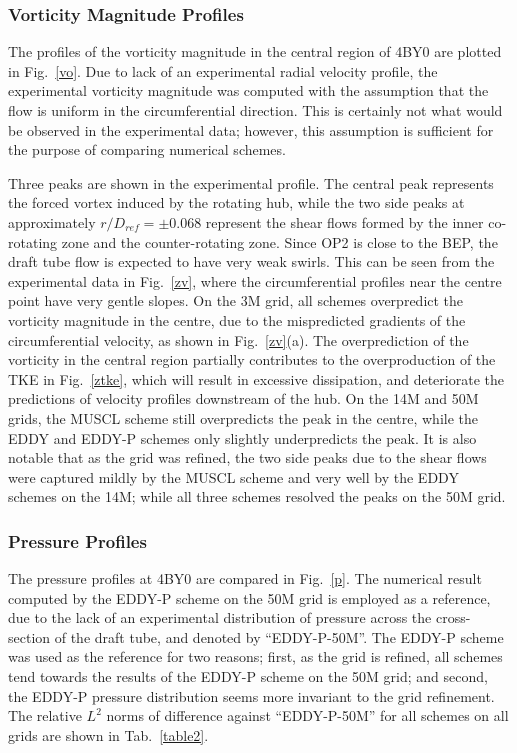 \subsubsection{Vorticity Magnitude Profiles}
The profiles of the vorticity magnitude in the central region of 4BY0 are plotted in Fig.~\ref{vo}. Due to lack of an experimental radial velocity profile, the experimental vorticity magnitude was computed with the assumption that the flow is uniform in the circumferential direction. This is certainly not what would be observed in the experimental data; however, this assumption is sufficient for the purpose of comparing numerical schemes. 

Three peaks are shown in the experimental profile. The central peak represents the forced vortex induced by the rotating hub, while the two side peaks at approximately $r/D_{ref}=\pm 0.068$ represent the shear flows formed by the inner co-rotating zone and the counter-rotating zone. Since OP2 is close to the BEP, the draft tube flow is expected to have very weak swirls. This can be seen from the experimental data in Fig.~\ref{zv}, where the circumferential profiles near the centre point have very gentle slopes. On the 3M grid, all schemes overpredict the vorticity magnitude in the centre, due to the mispredicted gradients of the circumferential velocity, as shown in Fig.~\ref{zv}(a). The overprediction of the vorticity in the central region partially contributes to the overproduction of the TKE in Fig.~\ref{ztke}, which will result in excessive dissipation, and deteriorate the predictions of velocity profiles downstream of the hub. On the 14M and 50M grids, the MUSCL scheme still overpredicts the peak in the centre, while the EDDY and EDDY-P schemes only slightly underpredicts the peak. It is also notable that as the grid was refined, the two side peaks due to the shear flows were captured mildly by the MUSCL scheme and very well by the EDDY schemes on the 14M; while all three schemes resolved the peaks on the 50M grid. 
\subsubsection{Pressure Profiles}
The pressure profiles at 4BY0 are compared in Fig.~\ref{p}. The numerical result computed by the EDDY-P scheme on the 50M grid is employed as a reference, due to the lack of an experimental distribution of pressure across the cross-section of the draft tube, and denoted by ``EDDY-P-50M''. The EDDY-P scheme was used as the reference for two reasons; first, as the grid is refined, all schemes tend towards the results of the EDDY-P scheme on the 50M grid; and second, the EDDY-P pressure distribution seems more invariant to the grid refinement. The relative $L^{2}$ norms of difference against ``EDDY-P-50M'' for all schemes on all grids are shown in Tab.~\ref{table2}. 

